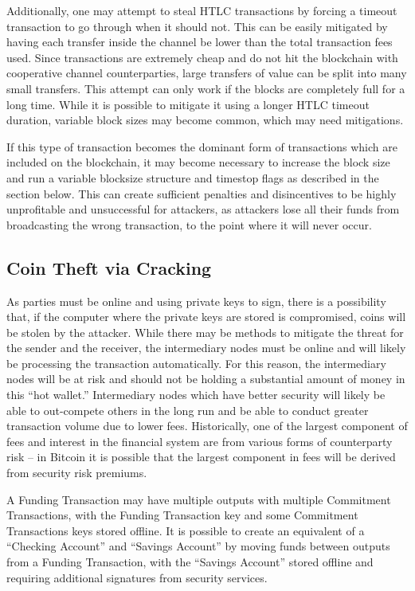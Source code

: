 \documentclass[letterpaper,11pt]{article}
\begin{document}
Additionally, one may attempt to steal HTLC transactions by forcing a timeout
transaction to go through when it should not. This can be easily mitigated by
having each transfer inside the channel be lower than the total transaction
fees used. Since transactions are extremely cheap and do not hit the blockchain
with cooperative channel counterparties, large transfers of value can be split
into many small transfers. This attempt can only work if the blocks are
completely full for a long time. While it is possible to mitigate it using a
longer HTLC timeout duration, variable block sizes may become common, which may
need mitigations.

If this type of transaction becomes the dominant form of transactions which are
included on the blockchain, it may become necessary to increase the block size
and run a variable blocksize structure and timestop flags as described in the
section below. This can create sufficient penalties and disincentives to be
highly unprofitable and unsuccessful for attackers, as attackers lose all their
funds from broadcasting the wrong transaction, to the point where it will never
occur.

\subsection{Coin Theft via Cracking}

As parties must be online and using private keys to sign, there is a
possibility that, if the computer where the private keys are stored is
compromised, coins will be stolen by the attacker. While there may be methods to
mitigate the threat for the sender and the receiver, the intermediary nodes must
be online and will likely be processing the transaction automatically. For this
reason, the intermediary nodes will be at risk and should not be holding a
substantial amount of money in this ``hot wallet.'' Intermediary nodes which
have better security will likely be able to out-compete others in the long run
and be able to conduct greater transaction volume due to lower fees.
Historically, one of the largest component of fees and interest in the financial
system are from various forms of counterparty risk -- in Bitcoin it is possible
that the largest component in fees will be derived from security risk premiums.

A Funding Transaction may have multiple outputs with multiple Commitment
Transactions, with the Funding Transaction key and some Commitment Transactions
keys stored offline. It is possible to create an equivalent of a ``Checking
Account'' and ``Savings Account'' by moving funds between outputs from a
Funding Transaction, with the ``Savings Account'' stored offline and requiring
additional signatures from security services.
\end{document}
